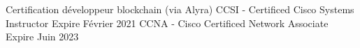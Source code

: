 
\begin{cvskills}
  \cvskill
    {Certification développeur blockchain (via Alyra)}
    {}
  \cvskill
    {CCSI - Certificed Cisco Systems Instructor}
    {Expire Février 2021}
  \cvskill
    {CCNA - Cisco Certificed Network Associate}
    {Expire Juin 2023}
\end{cvskills}